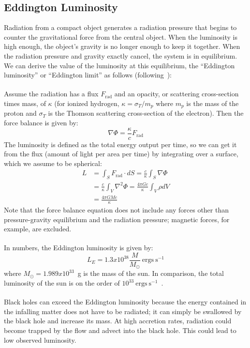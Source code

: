 \subsection{Eddington Luminosity}
Radiation from a compact object generates a radiation pressure that begins to counter the gravitational force from the central object. When the luminosity is high enough, the object's gravity is no longer enough to keep it together. When the radiation pressure and gravity exactly cancel, the system is in equilibrium. We can derive the value of the luminosity at this equilibrium, the ``Eddington luminosity'' or ``Eddington limit'' as follows (following~\citet{Spruit2009}):\\
\\
Assume the radiation has a flux $F_{\textrm{rad}}$ and an opacity, or scattering cross-section times mass, of $\kappa$ (for ionized hydrogen, $\kappa=\sigma_T/m_p$ where $m_p$ is the mass of the proton and $\sigma_T$ is the Thomson scattering cross-section of the electron). Then the force balance is given by:
\begin{equation}
\nabla\Phi=\frac\kappa cF_{\textrm{rad}}
\end{equation}
The luminosity is defined as the total energy output per time, so we can get it from the flux (amount of light per area per time) by integrating over a surface, which we assume to be spherical:
\begin{align}
L&=\int_SF_{\mathrm{rad}}\cdot dS=\frac{c}\kappa \int_S \nabla\Phi\\
&=\frac{c}\kappa \int_V \nabla^2\Phi=\frac{4\pi Gc}\kappa\int_V\rho dV\\
&=\frac{4\pi GMc}\kappa
\end{align}
Note that the force balance equation does not include any forces other than pressure-gravity equilibrium and the radiation pressure; magnetic forces, for example, are excluded. \\
\\
In numbers, the Eddington luminosity is given by:
\begin{equation}
  L_E=1.3x10^{38}\frac{M}{M_\odot}~\mathrm{ergs~s^{-1}}
\end{equation}
where $M_\odot=1.989x10^{33}$~g is the mass of the sun. In comparison, the total luminosity of the sun is on the order of $10^{33}~\mathrm{ergs~s^{-1}}$~\cite{BH1998}.\\
\\
Black holes can exceed the Eddington luminosity because the energy contained in the infalling matter does not have to be radiated; it can simply be swallowed by the black hole and increase its mass. At high accretion rates, radiation could become trapped by the flow and advect into the black hole. This could lead to low observed luminosity. 

